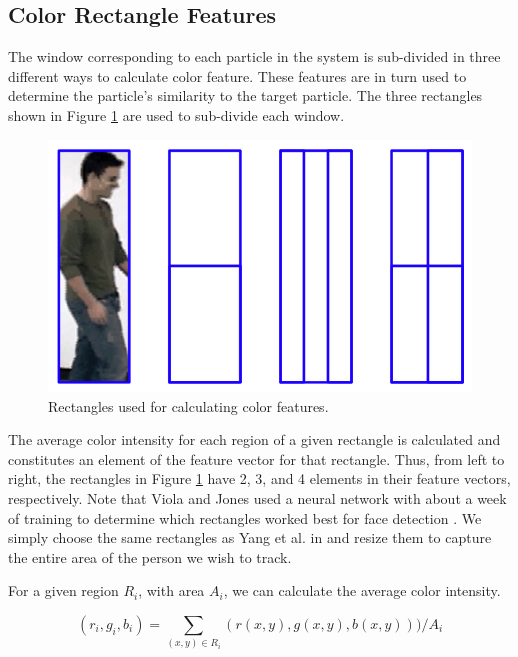 \documentclass[12pt]{article}
\begin{document}
\subsection{Color Rectangle Features}
\label{sec:colorrects}

The window corresponding to each particle in the system is sub-divided in three different ways to calculate color feature. These features are in turn used to determine the particle's similarity to the target particle. The three rectangles shown in Figure \ref{fig:rectfeatures} are used to sub-divide each window.

 \begin{figure}[H]
\centering
\includegraphics[scale=.4]{img/RectFeatures.jpg}
\caption{Rectangles used for calculating color features.}
\label{fig:rectfeatures}
\end{figure}

The average color intensity for each region of a given rectangle is calculated and constitutes an element of the feature vector for that rectangle. Thus, from left to right, the rectangles in Figure \ref{fig:rectfeatures} have 2, 3, and 4 elements in their feature vectors, respectively. Note that Viola and Jones used a neural network with about a week of training to determine which rectangles worked best for face detection \cite{facedetection}. We simply choose the same rectangles as Yang et al. in \cite{hybrid} and resize them to capture the entire area of the person we wish to track.

For a given region $R_i$, with area $A_i$, we can calculate the average color intensity.

\begin{equation}
(r_i,g_i,b_i) = \sum_{(x,y) \in R_i} (r(x,y), g(x,y), b(x,y))) / A_i
\label{eq:colorregionsum}
\end{equation}
\end{document}
